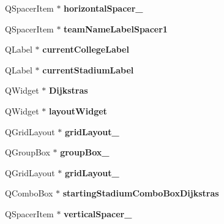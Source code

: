 \begin{DoxyCompactItemize}
Q\+Spacer\+Item $\ast$ {\bfseries horizontal\+Spacer\+\_}
\item 
\mbox{\label{class_ui___main_window_a697188e0e6a25418a16305924598569c}} 
Q\+Spacer\+Item $\ast$ {\bfseries team\+Name\+Label\+Spacer1}
\item 
\mbox{\label{class_ui___main_window_aa9ad62e54884be5f4cb824ea9c9a59ce}} 
Q\+Label $\ast$ {\bfseries current\+College\+Label}
\item 
\mbox{\label{class_ui___main_window_a91cfb702cfbd2d3e877d10121869534c}} 
Q\+Label $\ast$ {\bfseries current\+Stadium\+Label}
\item 
\mbox{\label{class_ui___main_window_af5cf00b8c4f9d0c2f4899884d07f2bd7}} 
Q\+Widget $\ast$ {\bfseries Dijkstras}
\item 
\mbox{\label{class_ui___main_window_ab96ab0f0578098521fa69a75aa5cdde8}} 
Q\+Widget $\ast$ {\bfseries layout\+Widget}
\item 
\mbox{\label{class_ui___main_window_a20728ed83bf740332bd908ea3e15ace6}} 
Q\+Grid\+Layout $\ast$ {\bfseries grid\+Layout\+\_}
\item 
\mbox{\label{class_ui___main_window_ad8a919e5634add9c41bfc319cb9fd338}} 
Q\+Group\+Box $\ast$ {\bfseries group\+Box\+\_}
\item 
\mbox{\label{class_ui___main_window_a4c2d544352d423a361b8ab2e1d5636ec}} 
Q\+Grid\+Layout $\ast$ {\bfseries grid\+Layout\+\_}
\item 
\mbox{\label{class_ui___main_window_ad31ec710cdca8618307abae590dfd10c}} 
Q\+Combo\+Box $\ast$ {\bfseries starting\+Stadium\+Combo\+Box\+Dijkstras}
\item 
\mbox{\label{class_ui___main_window_ac845bdf6b5b5237378a7b067808b7a31}} 
Q\+Spacer\+Item $\ast$ {\bfseries vertical\+Spacer\+\_}
\item 
\mbox{\label{class_ui___main_window_a1d094ac9c7dd9721830954c8f772aa88}} 

\end{DoxyCompactItemize}
